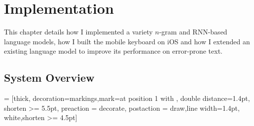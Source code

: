 \documentclass[a4paper, 12pt]{report}
\begin{document}
\chapter{Implementation} \label{implementation}

This chapter details how I implemented a variety $n$-gram and RNN-based language models, how I built the mobile keyboard on iOS and how I extended an existing language model to improve its performance on error-prone text.

\section{System Overview}

 = [thick, decoration={markings,mark=at position
	1 with {}},
	double distance=1.4pt, shorten >= 5.5pt,
	preaction = {decorate},
	postaction = {draw,line width=1.4pt, white,shorten >= 4.5pt}]
\end{document}
